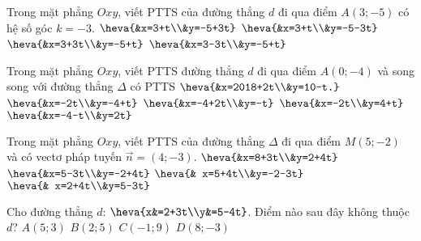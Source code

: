 \begin{ex}%
	Trong mặt phẳng $Oxy$, viết PTTS của đường thẳng $d$ đi qua điểm $A(3;-5)$ có hệ số góc $k=-3$.
	\choice
	{$\heva{&x=3+t\\&y=-5+3t}$}
	{\True$\heva{&x=3+t\\&y=-5-3t}$}
	{$\heva{&x=3+3t\\&y=-5+t}$}
	{$\heva{&x=3-3t\\&y=-5+t}$}
\end{ex}
\begin{ex}%
	Trong mặt phẳng $Oxy$, viết PTTS đường thẳng $d$ đi qua điểm $A(0;-4)$ và song song với đường thẳng $\Delta $ có PTTS $\heva{&x=2018+2t\\&y=10-t.}$
	\choice
	{\True $\heva{&x=-2t\\&y=-4+t}$}
	{$\heva{&x=-4+2t\\&y=-t}$}
	{$\heva{&x=-2t\\&y=4+t}$}
	{$\heva{&x=-4-t\\&y=2t}$}
\end{ex}
\begin{ex}%
	Trong mặt phẳng $Oxy$, viết PTTS của đường thẳng $\Delta$ đi qua điểm $M(5;-2)$ và có vectơ pháp tuyến $\overrightarrow{n} =(4;-3)$.
	\choice
	{\True $\heva{&x=8+3t\\&y=2+4t}$}
	{$\heva{&x=5-3t\\&y=-2+4t}$}
	{$\heva{& x=5+4t\\&y=-2-3t}$}
	{$\heva{& x=2+4t\\&y=5-3t}$}
\end{ex}


\begin{ex}%
	Cho đường thẳng $d$: $\heva{x&=2+3t\\y&=5-4t}$. Điểm nào sau đây không thuộc $d$?
	\choice
	{\True $A(5;3)$}
	{$B(2;5)$}
	{$C(-1;9)$}
	{$D(8;-3)$}
\end{ex}


